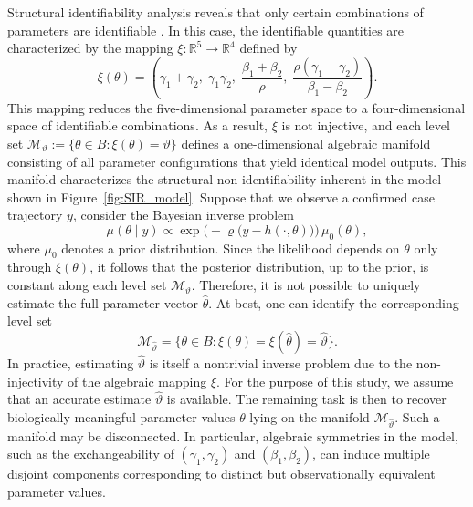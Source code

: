 \documentclass[12pt]{article}
\begin{document}
Structural identifiability analysis reveals that only certain combinations of parameters are identifiable \citep{j25,j26}. In this case, the identifiable quantities are characterized by the mapping $\xi : \mathbb{R}^5 \to \mathbb{R}^4$ defined by
\[
\xi(\theta) = 
\left(
\gamma_1 + \gamma_2,\;
\gamma_1 \gamma_2,\;
\frac{\beta_1 + \beta_2}{\rho},\;
\frac{\rho(\gamma_1 - \gamma_2)}{\beta_1 - \beta_2}
\right).
\]
This mapping reduces the five-dimensional parameter space to a four-dimensional space of identifiable combinations. As a result, $\xi$ is not injective, and each level set
\(
\mathcal{M}_{\vartheta} := \bigl\{\theta \in B : \xi(\theta) = \vartheta\bigr\}
\)
defines a one-dimensional algebraic manifold consisting of all parameter configurations that yield identical model outputs. This manifold characterizes the structural non-identifiability inherent in the model shown in Figure~\ref{fig:SIR_model}.
Suppose that we observe a confirmed case trajectory $y$, consider the Bayesian inverse problem
\[
\mu(\theta \mid y) 
\propto \exp\bigl(-\varrho\bigl(y - h(\cdot,\theta)\bigr)\bigr)\,\mu_0(\theta),
\]
where $\mu_0$ denotes a prior distribution. Since the likelihood depends on $\theta$ only through $\xi(\theta)$, it follows that the posterior distribution, up to the prior, is constant along each level set $\mathcal{M}_{\vartheta}$.
Therefore, it is not possible to uniquely estimate the full parameter vector $\widehat{\theta}$. At best, one can identify the corresponding level set
\[
\mathcal{M}_{\widehat{\vartheta}} 
= \bigl\{\theta \in B : \xi(\theta) = \xi(\widehat{\theta}) = \widehat{\vartheta}\bigr\}.
\]
In practice, estimating $\widehat{\vartheta}$ is itself a nontrivial inverse problem due to the non-injectivity of the algebraic mapping $\xi$. For the purpose of this study, we assume that an accurate estimate $\widehat{\vartheta}$ is available. The remaining task is then to recover biologically meaningful parameter values $\theta$ lying on the manifold $\mathcal{M}_{\widehat{\vartheta}}$.
Such a manifold may be disconnected. In particular, algebraic symmetries in the model, such as the exchangeability of $(\gamma_1, \gamma_2)$ and $(\beta_1, \beta_2)$, can induce multiple disjoint components corresponding to distinct but observationally equivalent parameter values.
\end{document}
